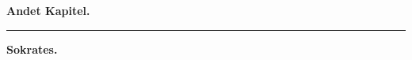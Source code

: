 \documentclass[12pt,a4paper]{book}
\newcommand{\divrule}{\begin{center}\rule{2cm}{0.4pt}\end{center}}
\begin{document}
\begin{center}
{\Large\textbf{Andet Kapitel.}}
\end{center}
\divrule
\begin{center}
\textbf{Sokrates.}
\end{center}
\end{document}
